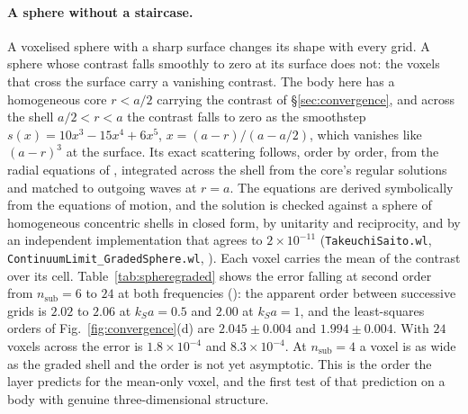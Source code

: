 \documentclass[11pt,a4paper]{article}
\newcommand{\nb}[1]{\texttt{#1}}
\begin{document}
\paragraph{A sphere without a staircase.} A voxelised sphere with a sharp surface changes its shape
with every grid. A sphere whose contrast falls smoothly to zero at its surface does not: the voxels
that cross the surface carry a vanishing contrast. The body here has a homogeneous core $r<a/2$
carrying the contrast of \S\ref{sec:convergence}, and across the shell $a/2<r<a$ the contrast falls to
zero as the smoothstep $s(x)=10x^3-15x^4+6x^5$, $x=(a-r)/(a-a/2)$, which vanishes like $(a-r)^3$ at the
surface. Its exact scattering follows, order by order, from the radial equations of
\citet{TakeuchiSaito1972}, integrated across the shell from the core's regular solutions and matched to
outgoing waves at $r=a$. The equations are derived symbolically from the equations of motion, and the
solution is checked against a sphere of homogeneous concentric shells in closed form, by unitarity and
reciprocity, and by an independent implementation that agrees to $2\times10^{-11}$
(\nb{TakeuchiSaito.wl}, \nb{ContinuumLimit\_GradedSphere.wl}, ).
Each voxel carries the mean of the contrast over its cell. Table~\ref{tab:spheregraded} shows the
error falling at second order from $n_{\mathrm{sub}}=6$ to $24$ at both frequencies
(): the apparent order between successive grids is $2.02$
to $2.06$ at $k_Sa=0.5$ and $2.00$ at $k_Sa=1$, and the least-squares orders of
Fig.~\ref{fig:convergence}(d) are $2.045\pm0.004$ and $1.994\pm0.004$. With $24$ voxels across the
error is $1.8\times10^{-4}$ and $8.3\times10^{-4}$. At $n_{\mathrm{sub}}=4$ a voxel is as wide as
the graded shell and the order is not yet asymptotic. This is the order the layer predicts for the
mean-only voxel, and the first test of that prediction on a body with genuine three-dimensional
structure.
\end{document}
